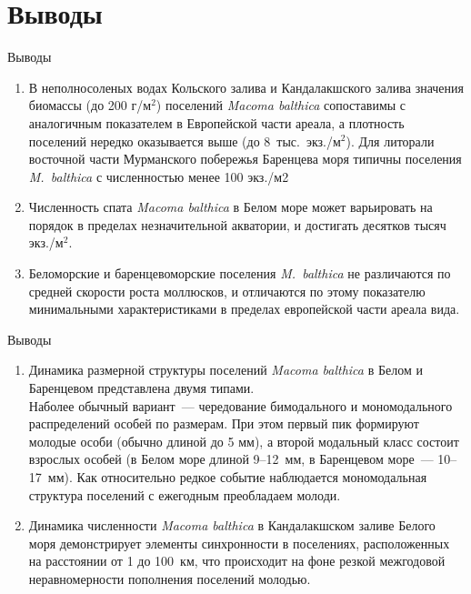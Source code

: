 \documentclass{beamer}
\begin{document}
		\section{Выводы}
\begin{small}

\begin{frame}{Выводы}
\addtocounter{enumi}{0}
	\begin{enumerate}
\item В неполносоленых водах Кольского залива и Кандалакшского залива значения биомассы (до 200 г/м$^2$) поселений {\it Macoma balthica} сопоставимы с аналогичным показателем в Европейской части ареала, а плотность поселений нередко оказывается выше (до 8~тыс.~экз./м$^2$). Для литорали восточной части Мурманского побережья Баренцева моря типичны поселения {\it M.~balthica} с численностью менее 100 экз./м2 
		\item Численность спата {\it Macoma balthica} в Белом море может варьировать на порядок в пределах незначительной акватории, и достигать десятков тысяч экз./м$^2$.
		\item Беломорские и баренцевоморские поселения {\it M.~balthica} не различаются по средней скорости роста моллюсков, и отличаются по этому показателю минимальными характеристиками в пределах европейской части ареала вида. 
		
	\end{enumerate}
\end{frame}


\begin{frame}{Выводы}
	\begin{enumerate}
\addtocounter{enumi}{3}
\item Динамика размерной структуры поселений {\it Macoma balthica} в Белом и Баренцевом представлена двумя типами. \\
Наболее обычный вариант~--- чередование бимодального и мономодального распределений особей по размерам. При этом первый пик формируют молодые
особи (обычно длиной до 5 мм), а второй модальный класс состоит взрослых особей (в Белом море длиной 9--12~мм, в Баренцевом море~--- 10--17~мм).
Как относительно редкое событие наблюдается мономодальная структура поселений с ежегодным преобладаем молоди.
		\item Динамика численности {\it Macoma balthica} в Кандалакшском заливе Белого моря демонстрирует элементы синхронности в поселениях, расположенных на расстоянии от 1 до 100~км, что происходит на фоне резкой межгодовой неравномерности пополнения поселений молодью.  
	\end{enumerate}
\end{frame}


\end{small}
\end{document}
